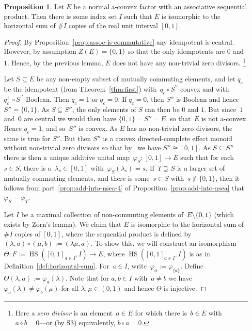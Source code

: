 \documentclass[a4paper, onecolumn, accepted=2020-12-22]{quantumarticle}
\DeclareMathOperator{\HS}{HS}
\newcommand{\mult}{\mathop{\circ}}
\newcounter{counter}
\theoremstyle{definition}
\newtheorem{proposition}[counter]{Proposition}
\begin{document}
\begin{proposition}\label{prop:assoc-a-convex}
    Let $E$ be a normal a-convex factor with an associative sequential product. Then there is some index set $I$ such that $E$ is isomorphic to the horizontal sum of $\# I$ copies of the real unit interval $[0,1]$.
\end{proposition}
\begin{proof}
    By Proposition~\ref{prop:assoc-is-commutative} any idempotent is central. 
    However, by assumption $Z(E) = \{0,1\}$
    so that the only idempotents are $0$ and $1$. 
    Hence, by the previous lemma, 
    $E$ does not have any non-trivial zero divisors.%
\footnote{Here a \emph{zero divisor} is an
  element~$a\in E$ for which there is~$b\in E$ with $a\mult b=0$---or (by S3) equivalently, $b\mult a=0$.}

    Let $S\subseteq E$ be any non-empty subset of mutually commuting elements,
    and let $q_c$ be the idempotent
    (from Theorem~\ref{thm:first})
        with~$q_c  \mult S^{\prime\prime}$ convex and
        with~$q_c^\perp \mult S^{\prime\prime}$ Boolean.
 Then $q_c = 1$ or $q_c = 0$. If $q_c = 0$,
    then $S''$ is Boolean and hence $S''=\{0,1\}$. As $S\subseteq
    S''$, the only elements of $S$ can then be $0$ and $1$. 
    But since~$1$ and~$0$ are central we would then have $\{0,1\} = S''=E$,
    so that~$E$ is not a-convex. Hence $q_c = 1$, and so~$S''$ is convex.
    As $E$ has no non-trivial zero divisors, the same is true for $S''$. But then
    $S''$ is a convex directed-complete effect monoid without
    non-trivial zero divisors so that 
    by~\cite[Theorem~71]{first} 
    we have $S''\cong [0,1]$.
    As $S\subseteq S''$ there is then a unique additive 
    unital map~$\varphi_S \colon [0,1] \to E$
        such that for each~$s \in S$,
        there is a~$\lambda_s \in [0,1]$
        with~$\varphi_S(\lambda_s) = s$.
    If~$T \supseteq S$ is a larger set of mutually commuting
        elements, and there is some~$s \in S$ with~$s \notin \{0,1\}$,
            then it follows from part~\ref{prop:add-into-nsea-4}
                of Proposition~\ref{prop:add-into-nsea}
                that~$\varphi_S = \varphi_T$.

    Let $I$ be a maximal collection of non-commuting elements
        of~$E \setminus \{0,1\}$ (which exists by Zorn's lemma).
    We claim that $E$ is
    isomorphic to the horizontal sum of $\# I$ copies of $[0,1]$,
        where the sequential product is defined by~$(\lambda, a) \mult (\mu, b) := (\lambda \mu, a)$.
    To show this, we will construct an isomorphism~$\Theta\colon F := \HS([0,1]_{a \in I}, I) \to E$,
    where $\HS([0,1]_{a\in I}, I)$ is as in 
    Definition~\ref{def:horizontal-sum}.
    For~$a \in I$, write~$\varphi_a := \varphi_{\{a\}}$.
    Define~$\Theta(\lambda, a) := \varphi_a (\lambda)$.
    Note that for $a,b \in I$ with~$a \neq b$ 
    we have~$\varphi_a(\lambda) \neq \varphi_b(\mu)$ for all $\lambda,\mu\in(0,1)$
    and hence $\Theta$ is injective.
    

\end{proof}
\end{document}
